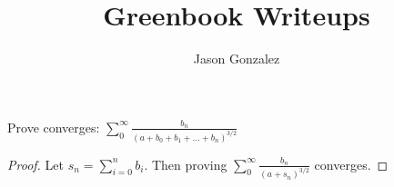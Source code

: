 \documentclass[10pt]{article}
\newenvironment{problem}[2][Problem]{\begin{trivlist}
\item[\hskip \labelsep {\bfseries #1}\hskip \labelsep {\bfseries #2.}]}{\end{trivlist}}
\begin{document}
\title{Greenbook Writeups}
\author{Jason Gonzalez}
\maketitle

\begin{problem}{1}
  Prove converges: 
  $\sum_{0}^{\infty} \frac{b_{n}}{(a + b_{0} + b_{1} + \ldots + b_{n})^{3/2}}$
\end{problem}

\begin{proof}
  Let $s_{n} = \sum_{i = 0}^{n} b_i$. 
  Then proving $\sum_{0}^{\infty} \frac{b_{n}}{(a + s_{n})^{3/2}}$ converges.


\end{proof}
\end{document}
